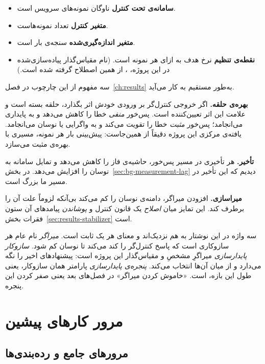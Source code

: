 \begin{itemize}
  \item \textbf{سامانه‌ی تحت کنترل} ناوگان نمونه‌های سرویس است.
  \item \textbf{متغیر کنترل} تعداد نمونه‌هاست.
  \item \textbf{متغیر اندازه‌گیری‌شده} سنجه‌ی بار است.
  \item \textbf{نقطه‌ی تنظیم} نرخ هدف به ازای هر نمونه است. (نام
  مقیاس‌گذار پیاده‌سازی‌شده در این پروژه، ، از همین اصطلاح گرفته شده است.)
\end{itemize}

سه مفهوم از این چارچوب در فصل~\ref{ch:results} به‌طور مستقیم به کار می‌آید.

\textbf{بهره‌ی حلقه.} اگر خروجی کنترل‌گر بر ورودی خودش اثر بگذارد،
حلقه بسته است و علامت این اثر تعیین‌کننده است. پس‌خور \emph{منفی} خطا را کاهش می‌دهد و به
پایداری می‌انجامد؛ پس‌خور \emph{مثبت} خطا را تقویت می‌کند و به واگرایی یا نوسان می‌انجامد.
یافته‌ی مرکزی این پروژه دقیقاً از همین‌جاست: پیش‌بینی بار هر نمونه، مسیری با بهره‌ی مثبت
می‌سازد.

\textbf{تأخیر.} هر تأخیری در مسیر پس‌خور، حاشیه‌ی فاز را کاهش می‌دهد و تمایل سامانه به نوسان
را افزایش می‌دهد. در بخش~\ref{sec:bg-measurement-lag} دیدیم که این تأخیر در مسیر ما بزرگ است.

\textbf{میراسازی.} افزودن میراگر، دامنه‌ی نوسان را کم می‌کند بی‌آنکه
لزوماً علت آن را برطرف کند. این تمایز \mdash{} میان \emph{اصلاح} یک قانون کنترل و \emph{پوشاندن}
پیامدهای آن \mdash{} ستون فقرات بخش~\ref{sec:results-stabilizer} است.

سه واژه در این نوشتار به هم نزدیک‌اند و معنای هر یک ثابت است. \emph{میراگر} نام عام هر
سازوکاری است که پاسخ کنترل‌گر را کند می‌کند تا نوسان کم شود. \emph{سازوکار پایدارسازی}
میراگرِ مشخصِ  و مقیاس‌گذار این پروژه است: پیشنهادهای اخیر را نگه می‌دارد و از میان
آن‌ها انتخاب می‌کند. \emph{پنجره‌ی پایدارسازی} پارامتر همان سازوکار، یعنی طول این بازه، است.
«خاموش کردن میراگر» در فصل‌های بعد یعنی صفر کردن این پنجره.

\section{مرور کارهای پیشین}
\label{sec:bg-relatedwork}

\subsection{مرورهای جامع و رده‌بندی‌ها}
\label{sec:bg-surveys}

